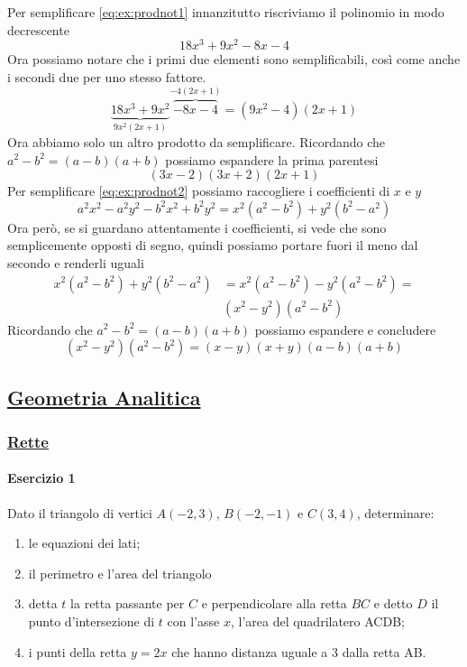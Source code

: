 Per semplificare \eqref{eq:ex:prodnot1} innanzitutto riscriviamo il polinomio in modo decrescente
\begin{equation*}
  18x^3 + 9x^2- 8x - 4
\end{equation*}
Ora possiamo notare che i primi due elementi sono semplificabili, così come anche i secondi due per 
uno stesso fattore.
\begin{equation*}
  \underbrace{18x^3 + 9x^2}_{9x^2(2x + 1)} \overbrace{- 8x - 4}^{-4(2x + 1)} = 
  (9x^2 - 4)(2x + 1)
\end{equation*}
Ora abbiamo solo un altro prodotto da semplificare. Ricordando che $a^2-b^2 = (a-b)(a+b)$ possiamo
espandere la prima parentesi
\begin{equation*}
  \boxed{(3x-2)(3x+2)(2x+1)}
\end{equation*}
Per semplificare \eqref{eq:ex:prodnot2} possiamo raccogliere i coefficienti di $x$ e $y$
\begin{equation*}
  a^2x^2 - a^2y^2 - b^2x^2 + b^2y^2 = x^2(a^2-b^2) + y^2(b^2-a^2)
\end{equation*}
Ora però, se si guardano attentamente i coefficienti, si vede che sono semplicemente opposti di segno,
quindi possiamo portare fuori il meno dal secondo e renderli uguali
\begin{align*}
  x^2(a^2-b^2) + y^2(b^2-a^2) &= x^2(a^2-b^2) -y^2(a^2-b^2) =\\ &(x^2 - y^2)(a^2-b^2)
\end{align*}
Ricordando che $a^2-b^2 = (a-b)(a+b)$ possiamo espandere e concludere
\begin{equation*}
  (x^2 - y^2)(a^2-b^2) = \boxed{(x-y)(x+y)(a-b)(a+b)}
\end{equation*}

\subsection*{\hyperref[sec:geomanal]{Geometria Analitica}}\label{ex:geomanal}
\subsubsection*{\hyperref[subsec:geomanal:retta]{Rette}}
\paragraph{Esercizio 1}
Dato il triangolo di vertici $A(-2,3)$, $B(-2,-1)$ e $C(3,4)$, determinare:
\begin{enumerate}
  \item le equazioni dei lati; \label{enum:ex:retta:1:1}
  \item il perimetro e l'area del triangolo \label{enum:ex:retta:1:2}
  \item detta $t$ la retta passante per $C$ e perpendicolare alla retta $BC$ e detto $D$ il punto
    d'intersezione di $t$ con l'asse $x$, l'area del quadrilatero ACDB; \label{enum:ex:retta:1:3}
  \item i punti della retta $y = 2x$ che hanno distanza uguale a $3$ dalla retta AB.
    \label{enum:ex:retta:1:4}
\end{enumerate}
\divisor

